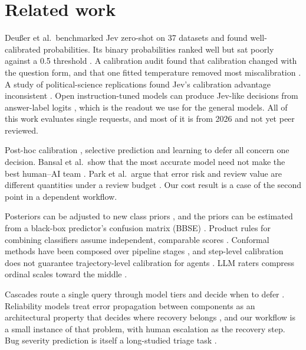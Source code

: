 \section{Related work}
\label{sec:related}

 Deu{\ss}er et al.\ benchmarked Jev
zero-shot on 37 datasets and found well-calibrated \choice{} probabilities. Its binary probabilities
ranked well but sat poorly against a 0.5 threshold \citep{deusser2026jev}. A calibration audit found that calibration changed with the question
form, and that one fitted temperature removed most miscalibration
\citep{meng2026jevaudit}. A study of political-science replications found
Jev's calibration advantage inconsistent \citep{denney2026jev}. Open instruction-tuned
models can produce Jev-like decisions from answer-label logits
\citep{geuter2026innerjev}, which is the readout we use for the general
models. All of this work evaluates single requests, and most of it is
from 2026 and not yet peer reviewed.

 Post-hoc calibration
\citep{platt1999probabilistic,guo2017calibration}, selective prediction
\citep{elyaniv2010selective,geifman2017selective} and learning to defer
\citep{madras2018predict,mozannar2020defer} all concern one decision.
Bansal et al.\ show that the most accurate model need not make the best
human--AI team \citep{bansal2021teammate}. Park et al.\ argue that
error risk and review value are different quantities under a review
budget \citep{park2026riskreview}. Our cost result is a case of the
second point in a dependent workflow.

 Posteriors can be adjusted to new
class priors \citep{saerens2002adjusting}, and the priors can be
estimated from a black-box predictor's confusion matrix (BBSE)
\citep{lipton2018bbse}. Product rules for combining classifiers assume
independent, comparable scores \citep{kittler1998combining}. Conformal
methods have been composed over pipeline stages \citep{kotte2026pasc},
and step-level calibration does not guarantee trajectory-level
calibration for agents \citep{lin2026uqagents}. LLM raters compress
ordinal scales toward the middle \citep{zhang2026centraltendency}.

 Cascades route a single query
through model tiers and decide when to defer
\citep{zellinger2025early,bouchard2026escalation,jung2025trust}.
Reliability models treat error propagation between components as an
architectural property that decides where recovery belongs
\citep{cortellessa2007errorprop}, and our workflow is a small instance
of that problem, with human escalation as the recovery step. Bug
severity prediction is itself a long-studied triage task
\citep{lamkanfi2010severity}.

